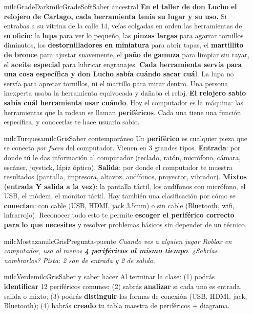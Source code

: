 \documentclass[11pt,letterpaper]{article}
\begin{document}
\begin{softbox}{milcGradeDark}{milcGradeSoft}{Saber ancestral}
\textbf{En el taller de don Lucho el relojero de Cartago, cada herramienta tenía su lugar y su uso.} Si entrabas a su vitrina de la calle 14, veías colgadas en orden las herramientas de su \textbf{oficio}: la \textbf{lupa} para ver lo pequeño, las \textbf{pinzas largas} para agarrar tornillos diminutos, los \textbf{destornilladores en miniatura} para abrir tapas, el \textbf{martillito de bronce} para ajustar suavemente, el \textbf{paño de gamuza} para limpiar sin rayar, el \textbf{aceite especial} para lubricar engranajes. \textbf{Cada herramienta servía para una cosa específica y don Lucho sabía cuándo sacar cuál}. La lupa no servía para apretar tornillos, ni el martillo para mirar dentro. Una persona inexperta usaba la herramienta equivocada y dañaba el reloj. \textbf{El relojero sabio sabía cuál herramienta usar cuándo}. Hoy el computador es la máquina: las herramientas que la rodean se llaman \textbf{periféricos}. Cada una tiene una función específica, y conocerlas te hace usuario sabio.
\end{softbox}

\begin{softbox}{milcTurquesa}{milcGris}{Saber contemporáneo}
Un \textbf{periférico} es cualquier pieza que se conecta \emph{por fuera} del computador. Vienen en 3 grandes tipos. \textbf{Entrada}: por donde tú le das información al computador (teclado, ratón, micrófono, cámara, escáner, joystick, lápiz óptico). \textbf{Salida}: por donde el computador te muestra resultados (pantalla, impresora, altavoz, audífonos, proyector, vibrador). \textbf{Mixtos (entrada Y salida a la vez)}: la pantalla táctil, los audífonos con micrófono, el USB, el módem, el monitor táctil. Hay también una clasificación por cómo se \textbf{conectan}: con cable (USB, HDMI, jack 3.5mm) o sin cable (Bluetooth, wifi, infrarrojo). Reconocer todo esto te permite \textbf{escoger el periférico correcto para lo que necesites} y resolver problemas básicos sin depender de un técnico.
\end{softbox}

\begin{softbox}{milcMostaza}{milcGris}{Pregunta-puente}
\textit{Cuando ves a alguien jugar Roblox en computador, usa al menos \textbf{4 periféricos al mismo tiempo}. ¿Sabrías nombrarlos? Pista: 2 son de entrada y 2 de salida.}
\end{softbox}

\begin{softbox}{milcVerde}{milcGris}{Saber y saber hacer}
Al terminar la clase: (1) podrás \textbf{identificar} 12 periféricos comunes; (2) sabrás \textbf{analizar} si cada uno es entrada, salida o mixto; (3) podrás \textbf{distinguir} las formas de conexión (USB, HDMI, jack, Bluetooth); (4) habrás \textbf{creado} tu tabla maestra de periféricos + diagrama.
\end{softbox}
\end{document}
